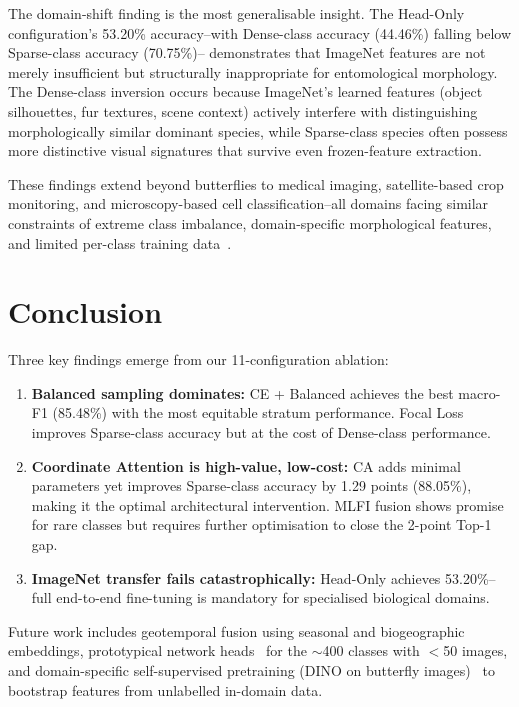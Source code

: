 \documentclass[11pt]{article}
\begin{document}
The domain-shift finding is the most generalisable insight. The Head-Only configuration's 53.20\% accuracy--with Dense-class accuracy (44.46\%) falling below Sparse-class accuracy (70.75\%)-- demonstrates that ImageNet features are not merely insufficient but structurally inappropriate for entomological morphology. The Dense-class inversion occurs because ImageNet's learned features (object silhouettes, fur textures, scene context) actively interfere with distinguishing morphologically similar dominant species, while Sparse-class species often possess more distinctive visual signatures that survive even frozen-feature extraction.

These findings extend beyond butterflies to medical imaging, satellite-based crop monitoring, and microscopy-based cell classification--all domains facing similar constraints of extreme class imbalance, domain-specific morphological features, and limited per-class training data~\cite{amarathunga2022thrips}.

\section{Conclusion}

Three key findings emerge from our 11-configuration ablation:
\begin{enumerate}[label=(\arabic*)]
    \item \textbf{Balanced sampling dominates:} CE + Balanced achieves the best macro-F1 (85.48\%) with the most equitable stratum performance. Focal Loss improves Sparse-class accuracy but at the cost of Dense-class performance.
    \item \textbf{Coordinate Attention is high-value, low-cost:} CA adds minimal parameters yet improves Sparse-class accuracy by 1.29 points (88.05\%), making it the optimal architectural intervention. MLFI fusion shows promise for rare classes but requires further optimisation to close the 2-point Top-1 gap.
    \item \textbf{ImageNet transfer fails catastrophically:} Head-Only achieves 53.20\%--full end-to-end fine-tuning is mandatory for specialised biological domains.
\end{enumerate}

Future work includes geotemporal fusion using seasonal and biogeographic embeddings, prototypical network heads~\cite{snell2017prototypical} for the $\sim$400 classes with $<$50 images, and domain-specific self-supervised pretraining (DINO on butterfly images)~\cite{feichtenhofer2022masked} to bootstrap features from unlabelled in-domain data.
\end{document}
